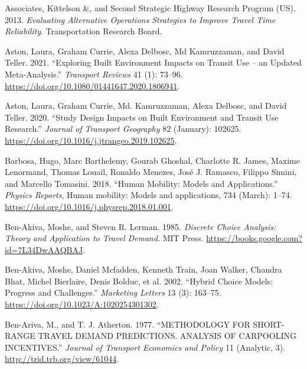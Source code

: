 \documentclass[
  11pt,
  openany]{memoir}
\newlength{\cslhangindent}
\newlength{\cslentryspacingunit} %
\newenvironment{CSLReferences}[2] %
 {%
  \setlength{\parindent}{0pt}
  \ifodd #1
  \let\oldpar\par
  \def\par{\hangindent=\cslhangindent\oldpar}
  \fi
  \setlength{\parskip}{#2\cslentryspacingunit}
 }%
 {}
\begin{document}
\begin{CSLReferences}{1}{0}
\leavevmode{}%
Associates, Kittelson \&, and Second Strategic Highway Research Program (US). 2013. \emph{Evaluating Alternative Operations Strategies to Improve Travel Time Reliability}. Transportation Research Board.

\leavevmode{}%
Aston, Laura, Graham Currie, Alexa Delbosc, Md Kamruzzaman, and David Teller. 2021. {``Exploring Built Environment Impacts on Transit Use -- an Updated Meta-Analysis.''} \emph{Transport Reviews} 41 (1): 73--96. \url{https://doi.org/10.1080/01441647.2020.1806941}.

\leavevmode{}%
Aston, Laura, Graham Currie, Md. Kamruzzaman, Alexa Delbosc, and David Teller. 2020. {``Study Design Impacts on Built Environment and Transit Use Research.''} \emph{Journal of Transport Geography} 82 (January): 102625. \url{https://doi.org/10.1016/j.jtrangeo.2019.102625}.

\leavevmode{}%
Barbosa, Hugo, Marc Barthelemy, Gourab Ghoshal, Charlotte R. James, Maxime Lenormand, Thomas Louail, Ronaldo Menezes, José J. Ramasco, Filippo Simini, and Marcello Tomasini. 2018. {``Human Mobility: Models and Applications.''} \emph{Physics Reports}, Human mobility: Models and applications, 734 (March): 1--74. \url{https://doi.org/10.1016/j.physrep.2018.01.001}.

\leavevmode{}%
Ben-Akiva, Moshe, and Steven R. Lerman. 1985. \emph{Discrete {Choice Analysis}: Theory and {Application} to {Travel Demand}}. {MIT Press}. \url{https://books.google.com?id=7L34DwAAQBAJ}.

\leavevmode{}%
Ben-Akiva, Moshe, Daniel Mcfadden, Kenneth Train, Joan Walker, Chandra Bhat, Michel Bierlaire, Denis Bolduc, et al. 2002. {``Hybrid {Choice Models}: Progress and {Challenges}.''} \emph{Marketing Letters} 13 (3): 163--75. \url{https://doi.org/10.1023/A:1020254301302}.

\leavevmode{}%
Ben-Ariva, M., and T. J. Atherton. 1977. {``{METHODOLOGY FOR SHORT}-{RANGE TRAVEL DEMAND PREDICTIONS}. {ANALYSIS OF CARPOOLING INCENTIVES}.''} \emph{Journal of Transport Economics and Policy} 11 (Analytic, 3). \url{http://trid.trb.org/view/61044}.


\end{CSLReferences}
\end{document}
